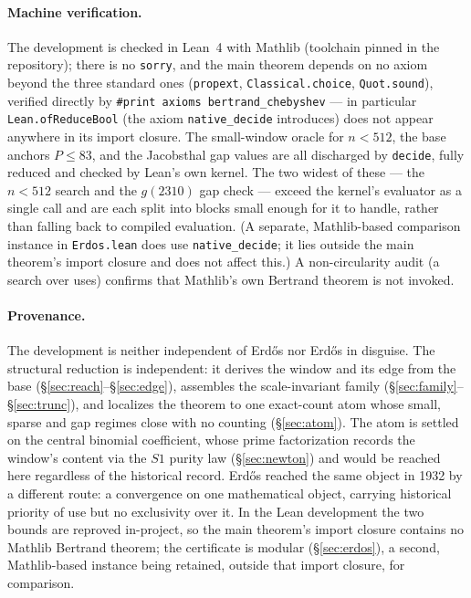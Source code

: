 \documentclass[11pt,a4paper]{amsart}
\theoremstyle{plain}
\theoremstyle{definition}
\theoremstyle{plain}
\theoremstyle{remark}
\newcommand{\lean}[1]{\textup{\texttt{#1}}}
\begin{document}
\paragraph{Machine verification.}
The development is checked in Lean~4 with Mathlib (toolchain pinned in the repository);
there is no \texttt{sorry}, and the main theorem depends on no axiom beyond the three
standard ones (\texttt{propext}, \texttt{Classical.choice}, \texttt{Quot.sound}), verified
directly by \lean{\#print axioms bertrand\_chebyshev} --- in particular
\lean{Lean.ofReduceBool} (the axiom \lean{native\_decide} introduces) does not appear
anywhere in its import closure. The small-window oracle for $n<512$, the base anchors
$P\le83$, and the Jacobsthal gap values are all discharged by \lean{decide}, fully reduced
and checked by Lean's own kernel. The two widest of these --- the $n<512$ search and the
$g(2310)$ gap check --- exceed the kernel's evaluator as a single call and are each split
into blocks small enough for it to handle, rather than falling back to compiled evaluation.
(A separate, Mathlib-based comparison instance in \lean{Erdos.lean} does use
\lean{native\_decide}; it lies outside the main theorem's import closure and does not affect
this.) A non-circularity audit (a search over uses) confirms that Mathlib's own Bertrand
theorem is not invoked.

\paragraph{Provenance.}
The development is neither independent of Erd\H{o}s nor Erd\H{o}s in disguise. The
structural reduction is independent: it derives the window and its edge from the base
(\S\ref{sec:reach}--\S\ref{sec:edge}), assembles the scale-invariant family
(\S\ref{sec:family}--\S\ref{sec:trunc}), and localizes the theorem to one exact-count atom
whose small, sparse and gap regimes close with no counting (\S\ref{sec:atom}). The atom is
settled on the central binomial coefficient, whose prime factorization records the window's
content via the $S1$ purity law (\S\ref{sec:newton}) and would be reached here regardless of
the historical record. Erd\H{o}s reached the same object in 1932 by a different route: a
convergence on one mathematical object, carrying historical priority of use but no exclusivity
over it. In the Lean development the two bounds are reproved in-project, so the main theorem's
import closure contains no Mathlib Bertrand theorem; the certificate is modular
(\S\ref{sec:erdos}), a second, Mathlib-based instance being retained, outside that import
closure, for comparison.
\end{document}
